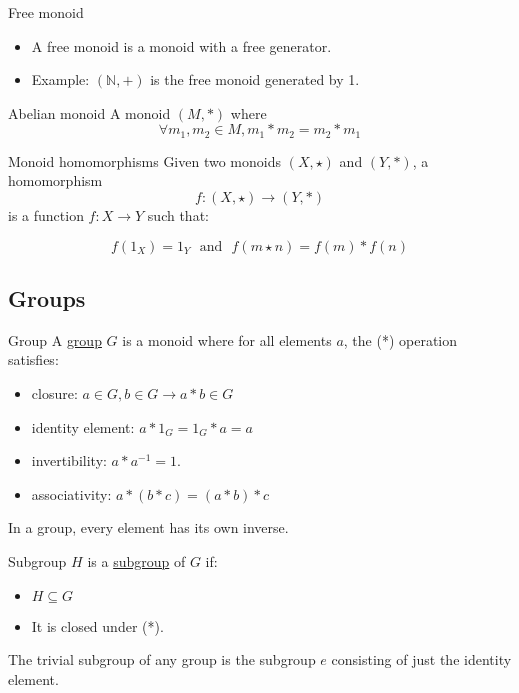 \documentclass[presentation]{beamer}
\begin{document}
\begin{frame}[label={sec:org20934c5}]{Free monoid}
\begin{itemize}
\item A free monoid is a monoid \alert{with a free generator}.

\item Example: \((\mathbb{N}, +)\) is the \alert{free monoid generated by 1}.
\end{itemize}
\end{frame}

\begin{frame}[label={sec:org76d08d1}]{Abelian monoid}
A monoid \((M,*)\) where $$\forall m_1,m_2 \in M, m_1 * m_2 = m_2 * m_1$$
\end{frame}

\begin{frame}[label={sec:org7d4aa7f}]{Monoid homomorphisms}
Given two monoids \((X,\star)\) and \((Y, *)\), a homomorphism $$f: (X,\star)
    \rightarrow (Y,*)$$ is a function \(f: X \rightarrow Y\) such that:

\[
      f(1_X) = 1_Y \textrm{~~and~~} f(m \star n) = f(m) * f(n)
    \]
\end{frame}

\subsection{Groups}
\label{sec:org24b7cac}
\begin{frame}[label={sec:orgc74f5d2}]{Group}
A \href{https://en.wikipedia.org/wiki/Group\_(mathematics)}{group} \(G\) is a monoid where for all elements \(a\), the (*) operation satisfies:

\begin{itemize}
\item \alert{closure}: \(a \in G, b \in G \rightarrow a * b \in G\)
\item \alert{identity element}: \(a * 1_G = 1_G * a = a\)
\item \alert{invertibility}: \(a * a^{-1} = 1\).
\item \alert{associativity}: \(a * (b * c) = (a * b) * c\)
\end{itemize}

In a group, every element has its own inverse.
\end{frame}

\begin{frame}[label={sec:orgb369ccf}]{Subgroup}
\(H\) is a \href{https://en.wikipedia.org/wiki/Subgroup}{subgroup} of \(G\) if:

\begin{itemize}
\item \(H \subseteq G\)
\item It is closed under (*).
\end{itemize}

The \alert{trivial subgroup} of any group is the subgroup \({e}\) consisting of just the identity element.
\end{frame}
\end{document}
